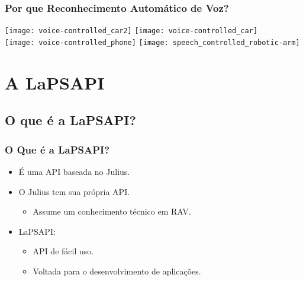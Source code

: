 \documentclass{beamer}
\begin{document}
\begin{frame}
   \frametitle{Por que Reconhecimento Automático de Voz?}
   \vspace{0.5cm}
   \texttt{[image: voice-controlled\_car2]}
   \hspace{1cm}
   \texttt{[image: voice-controlled\_car]}\\

   \texttt{[image: voice-controlled\_phone]}
   \texttt{[image: speech\_controlled\_robotic-arm]}
\end{frame}

\section{A LaPSAPI}
\subsection{O que é a LaPSAPI?}

\begin{frame}
   \frametitle{O Que é a LaPSAPI?}
   \begin{itemize}
      \item É uma API baseada no Julius.
      
      \pause
      \item O Julius tem sua própria API.
      \begin{itemize}
	 \item Assume um conhecimento técnico em RAV.
      \end{itemize}

      \pause
      \item LaPSAPI:
      \begin{itemize}
	 \item API de fácil uso.
	 \item Voltada para o desenvolvimento de
	    aplicações.
      \end{itemize}
   \end{itemize}
\end{frame}
\end{document}
